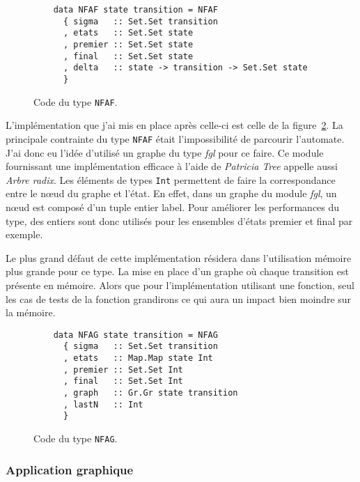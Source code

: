 \begin{figure}[H]
    \begin{verbatim}
    data NFAF state transition = NFAF
      { sigma   :: Set.Set transition
      , etats   :: Set.Set state
      , premier :: Set.Set state
      , final   :: Set.Set state
      , delta   :: state -> transition -> Set.Set state
      }
  \end{verbatim}
    \caption{Code du type \texttt{NFAF}.}\label{fig:codeNFAF}
\end{figure}

\vphantom{}

L'implémentation que j'ai mis en place après celle-ci est celle de la
figure~\ref{fig:codeNFAG}. La principale contrainte du type
\texttt{NFAF} était l'impossibilité de parcourir l'automate. J'ai
donc eu l'idée d'utilisé un graphe du type \textit{fgl} pour ce faire. Ce module
fournissant une implémentation efficace à l'aide de \textit{Patricia Tree}
appelle aussi \textit{Arbre radix}. Les éléments de types
\texttt{Int} permettent de faire la correspondance entre le n\oe ud
du graphe et l'état. En effet, dans un graphe du module \textit{fgl}, un n\oe ud
est composé d'un tuple entier label. Pour améliorer les performances du type,
des entiers sont donc utilisés pour les ensembles d'états premier et final par
exemple.

\vphantom{}

Le plus grand défaut de cette implémentation résidera dans l'utilisation
mémoire plus grande pour ce type. La mise en place d'un graphe où chaque
transition est présente en mémoire. Alors que pour l'implémentation utilisant
une fonction, seul les cas de tests de la fonction grandirons ce qui aura un
impact bien moindre sur la mémoire.

\begin{figure}[H]
    \begin{verbatim}
    data NFAG state transition = NFAG
      { sigma   :: Set.Set transition
      , etats   :: Map.Map state Int
      , premier :: Set.Set Int
      , final   :: Set.Set Int
      , graph   :: Gr.Gr state transition
      , lastN   :: Int
      }
  \end{verbatim}
    \caption{Code du type \texttt{NFAG}.}\label{fig:codeNFAG}
\end{figure}

\subsubsection{Application graphique}

